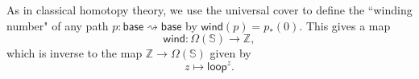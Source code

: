 \documentclass[11pt]{article}
\newcommand{\Sn}{\mathbb{S}}
\newcommand{\Z}{\mathbb{Z}}
\newcommand{\lloop}{\mathsf{loop}}
\newcommand{\base}{\mathsf{base}}
\newcommand{\cov}{\mathsf{cov}}
\begin{document}
%

As in classical homotopy theory, we use the universal cover to define the ``winding number" of any path $p : \base\rightsquigarrow\base$ by $\mathsf{wind}(p)=p_*(0)$. %
 This gives a map
\[
\mathsf{wind} : \Omega(\Sn)\to\Z,
\]
which is inverse to the map $\Z\to\Omega(\Sn)$ given by
\[
z \mapsto \lloop^z.
\]
\end{document}
